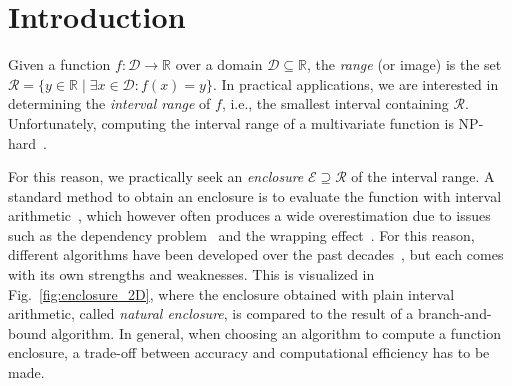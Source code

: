 \documentclass{juliacon}
\begin{document}
\newcommand{\R}{\ensuremath{\mathbb{R}}}
\newcommand{\RE}{RangeEnclosures}
\newcommand{\pkgl}[2]{\href{#1}{\pkg{#2}}}
\newcommand{\pkg}[1]{\texttt{#1.jl}}



\maketitle

\begin{abstract}
Computing the range of a function is needed in several application domains. During the past decades, several algorithms to compute or approximate the range have been developed, each with its own merits and limitations.
Motivated by this, we introduce \pkg{\RE}, a unified framework to bound the range of univariate and multivariate functions. In addition to its own algorithms, the package allows to easily integrate third-party algorithms, offering a unified interface that can be used across different domains and allows to easily benchmark different approaches.
\end{abstract}



\section{Introduction}

Given a function $f: \mathcal{D} \to \R$ over a domain $\mathcal{D}\subseteq\R$, the \emph{range} (or image) is the set $\mathcal{R}=\{y\in\R \mid \exists x\in\mathcal{D}: f(x)=y\}$. In practical applications, we are interested in determining the \textit{interval range} of $f$, i.e., the smallest interval containing $\mathcal{R}$. Unfortunately, computing the interval range of a multivariate function is NP-hard~\cite{kreinovich2002range}.

For this reason, we practically seek an \textit{enclosure} $\mathcal{E}\supseteq\mathcal{R}$ of the interval range. A standard method to obtain an enclosure is to evaluate the function with interval arithmetic~\cite{moore2009introduction}, which however often produces a wide overestimation due to issues such as the dependency problem~\cite{de2004affine} and the wrapping effect~\cite{neumaier1993wrapping}. For this 
reason, different algorithms have been developed over the past decades~\cite{vzilinskas2007survey}, but each comes with its own strengths and weaknesses. This is visualized in Fig.~\ref{fig:enclosure_2D}, where the enclosure obtained with plain interval arithmetic, called \emph{natural enclosure}, is compared to the result of a branch-and-bound algorithm. In general, when choosing an algorithm to compute a function enclosure, a trade-off between accuracy and computational efficiency has to be made.
\end{document}
